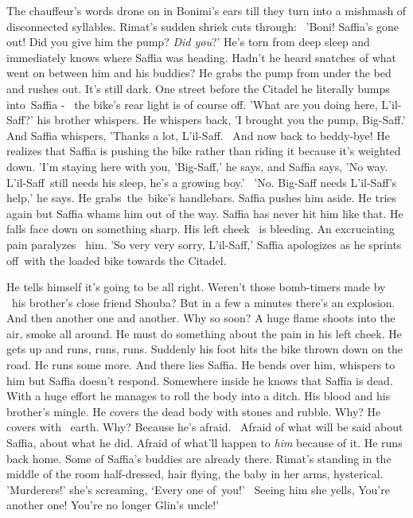 \documentclass[letterpaper]{article}
\begin{document}
The chauffeur's words drone on in Bonimi's ears till they turn into a mishmash of disconnected syllables. Rimat's sudden
shriek cuts through: \ {}'Boni! Saffia's gone out! Did you give him the pump? \textit{Did you}?' He's torn from deep
sleep and immediately knows where Saffia was heading. Hadn't he heard snatches of what went on between him and his
buddies? He grabs the pump from under the bed and rushes out. It's still dark. One street before the Citadel he
literally bumps into~Saffia - \ the bike's rear light is of course off. 'What are you doing here, L'il-Saff?' his
brother whispers. He whispers back, 'I brought you the pump, Big-Saff.' And Saffia whispers, 'Thanks a lot, L'il-Saff.
~And now back to beddy-bye!{\textquotedbl} He realizes that Saffia is pushing the bike rather than riding it because
it's weighted down. 'I'm staying here with you, 'Big-Saff,' he says, and Saffia says, 'No way. L'il-Saff~still needs
his sleep, he's a growing boy.' \ {}'No. Big-Saff needs L'il-Saff's help,' he says. He grabs~the~bike's handlebars.
Saffia pushes him aside. He tries again but Saffia whams him out of the way. Saffia has never hit him like that. He
falls face down on something sharp. His left cheek\textcolor{red}{ \ }is bleeding. An excruciating pain paralyzes
\ him. 'So very very sorry, L'il-Saff,' Saffia apologizes as he sprints off~with the loaded bike towards the Citadel.

He tells himself it's going to be all right. Weren't those bomb-timers made by \ his brother's close friend Shouba? But
in a few a minutes there's an explosion. And then another one and another. Why so soon? A huge flame shoots into the
air, smoke all around. He must do something about the pain in his left cheek. He gets up and runs, runs, runs. Suddenly
his foot hits the bike thrown down on the road. He runs some more. And there lies Saffia. He bends over him, whispers
to him but Saffia doesn't respond. Somewhere inside he knows that Saffia is dead. With a huge effort he manages to roll
the body into a ditch. His blood and his brother's mingle\textcolor{red}{. }He covers the dead body with stones and
rubble. Why? He covers with \ earth. Why? Because he's afraid. ~Afraid of what will be said about Saffia, about what he
did. Afraid of what'll happen to \textit{him} because of it. He runs back home. Some of Saffia's buddies are already
there. Rimat's standing in the middle of the room half-dressed, hair flying, the baby in her arms, hysterical.
'Murderers!' she's screaming, `Every one of~you!' \ Seeing him she yells, {\textquotedbl}You're another one! You're no
longer Glin's uncle!'
\end{document}
